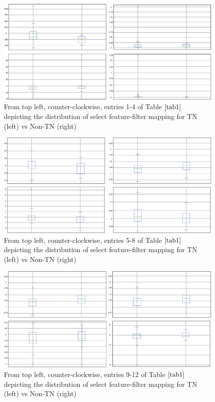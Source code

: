 \documentclass[10pt,final,1p,times,twocolumn]{elsarticle}
\begin{document}
\begin{figure}[hbt!]
\centering
\includegraphics[width=14cm]{1-4.png}
\caption{From top left, counter-clockwise, entries 1-4 of Table $\ref{tab1}$ depicting the distribution of select feature-filter mapping for TN (left) vs Non-TN (right)}
\label{1-4}
\end{figure}
\begin{figure}[hbt!]
\centering
\includegraphics[width=14cm]{5-8.png}
\caption{From top left, counter-clockwise, entries 5-8 of Table $\ref{tab1}$ depicting the distribution of select feature-filter mapping for TN (left) vs Non-TN (right)}
\label{5-8}
\end{figure}
\begin{figure}[hbt!]
\centering
\includegraphics[width=14cm]{9-12.png}
\caption{From top left, counter-clockwise, entries 9-12 of Table $\ref{tab1}$ depicting the distribution of select feature-filter mapping for TN (left) vs Non-TN (right)}
\label{9-12}
\end{figure}
\end{document}
